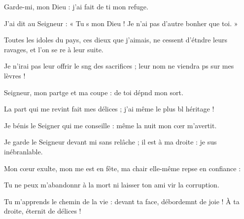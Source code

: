 \item Garde-mi, mon Dieu :\psstar{} j’ai fait de ti mon refuge.
\item J’ai dit au Seigneur : « Tu s mon Dieu !\psstar{} Je n’ai pas d’autre bonher que toi. »
\item Toutes les idoles du pays, ces dieux que j’aimais,\pscross{} ne cessent d’étndre leurs ravages,\psstar{} et l’on se re à leur suite.
\item Je n’irai pas leur offrir le sng des sacrifices ;\psstar{} leur nom ne viendra ps sur mes lèvres !
\item Seigneur, mon partge et ma coupe :\psstar{} de toi dépnd mon sort.
\item La part qui me revint fait mes délices ;\psstar{} j’ai même le plus bl héritage !
\item Je bénis le Seigner qui me conseille :\psstar{} même la nuit mon cœr m’avertit.
\item Je garde le Seigneur devant mi sans relâche ;\psstar{} il est à ma droite : je sus inébranlable.
\item Mon cœur exulte, mon me est en fête,\psstar{} ma chair elle-même repse en confiance :
\item Tu ne peux m’abandonnr à la mort\psstar{} ni laisser ton ami vir la corruption.
\item Tu m’apprends le chemin de la vie :\pscross{} devant ta face, débordemnt de joie !\psstar{} À ta droite, éternit de délices !
